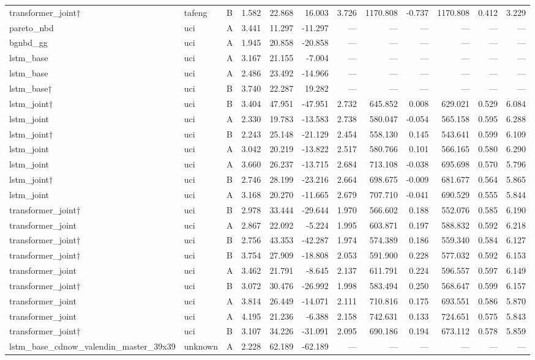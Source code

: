\begin{table}
\begin{tabular}{lllrrrrrrrrr}
transformer_joint† & tafeng & B & 1.582 & 22.868 & 16.003 & 3.726 & 1170.808 & -0.737 & 1170.808 & 0.412 & 3.229 \\
pareto_nbd & uci & A & 3.441 & 11.297 & -11.297 & — & — & — & — & — & — \\
bgnbd_gg & uci & A & 1.945 & 20.858 & -20.858 & — & — & — & — & — & — \\
lstm_base & uci & A & 3.167 & 21.155 & -7.004 & — & — & — & — & — & — \\
lstm_base & uci & A & 2.486 & 23.492 & -14.966 & — & — & — & — & — & — \\
lstm_base† & uci & B & 3.740 & 22.287 & 19.282 & — & — & — & — & — & — \\
lstm_joint† & uci & B & 3.404 & 47.951 & -47.951 & 2.732 & 645.852 & 0.008 & 629.021 & 0.529 & 6.084 \\
lstm_joint & uci & A & 2.330 & 19.783 & -13.583 & 2.738 & 580.047 & -0.054 & 565.158 & 0.595 & 6.288 \\
lstm_joint† & uci & B & 2.243 & 25.148 & -21.129 & 2.454 & 558.130 & 0.145 & 543.641 & 0.599 & 6.109 \\
lstm_joint & uci & A & 3.042 & 20.219 & -13.822 & 2.517 & 580.766 & 0.101 & 566.165 & 0.580 & 6.290 \\
lstm_joint & uci & A & 3.660 & 26.237 & -13.715 & 2.684 & 713.108 & -0.038 & 695.698 & 0.570 & 5.796 \\
lstm_joint† & uci & B & 2.746 & 28.199 & -23.216 & 2.664 & 698.675 & -0.009 & 681.677 & 0.564 & 5.865 \\
lstm_joint & uci & A & 3.168 & 20.270 & -11.665 & 2.679 & 707.710 & -0.041 & 690.529 & 0.555 & 5.844 \\
transformer_joint† & uci & B & 2.978 & 33.444 & -29.644 & 1.970 & 566.602 & 0.188 & 552.076 & 0.585 & 6.190 \\
transformer_joint & uci & A & 2.867 & 22.092 & -5.224 & 1.995 & 603.871 & 0.197 & 588.832 & 0.592 & 6.218 \\
transformer_joint† & uci & B & 2.756 & 43.353 & -42.287 & 1.974 & 574.389 & 0.186 & 559.340 & 0.584 & 6.127 \\
transformer_joint† & uci & B & 3.754 & 27.909 & -18.808 & 2.053 & 591.900 & 0.228 & 577.032 & 0.592 & 6.153 \\
transformer_joint & uci & A & 3.462 & 21.791 & -8.645 & 2.137 & 611.791 & 0.224 & 596.557 & 0.597 & 6.149 \\
transformer_joint† & uci & B & 3.072 & 30.476 & -26.992 & 1.998 & 583.494 & 0.250 & 568.647 & 0.599 & 6.157 \\
transformer_joint & uci & A & 3.814 & 26.449 & -14.071 & 2.111 & 710.816 & 0.175 & 693.551 & 0.586 & 5.870 \\
transformer_joint & uci & A & 4.195 & 21.236 & -6.388 & 2.158 & 742.631 & 0.133 & 724.651 & 0.575 & 5.843 \\
transformer_joint† & uci & B & 3.107 & 34.226 & -31.091 & 2.095 & 690.186 & 0.194 & 673.112 & 0.578 & 5.859 \\
lstm_base_cdnow_valendin_master_39x39 & unknown & A & 2.228 & 62.189 & -62.189 & — & — & — & — & — & — \\
\bottomrule
\end{tabular}
\end{table}
